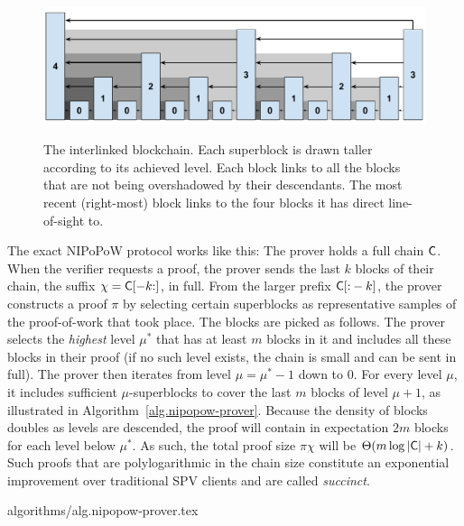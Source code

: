 \begin{figure}[ht]
    \caption{The interlinked blockchain. Each superblock is drawn taller
    according to its achieved level. Each block links to all the blocks that are
    not being overshadowed by their descendants. The most recent (right-most)
    block links to the four blocks it has direct line-of-sight to.}
    \centering
    \includegraphics[width=0.9\columnwidth,keepaspectratio]{figures/level-shadows.pdf}
    \label{fig.hierarchy}
\end{figure}

The exact NIPoPoW protocol works like this: The prover holds a full chain
$\mathsf{C}$. When the verifier requests a proof, the prover sends the last $k$
blocks of their chain, the suffix $\chi = \mathsf{C}[-k{:}]$, in full. From the
larger prefix $\mathsf{C}[{:}-k]$, the prover constructs a proof $\pi$ by selecting
certain superblocks as representative samples of the proof-of-work that took
place. The blocks are picked as follows. The prover selects the \emph{highest}
level $\mu^*$ that has at least $m$ blocks in it and includes all these blocks
in their proof (if no such level exists, the chain is small and can be sent in
full). The prover then iterates from level $\mu = \mu^* - 1$ down to $0$. For
every level $\mu$, it includes sufficient $\mu$-superblocks to cover the last
$m$ blocks of level $\mu + 1$, as illustrated in
Algorithm~\ref{alg.nipopow-prover}. Because the density of blocks doubles as
levels are descended, the proof will contain in expectation $2m$ blocks for each
level below $\mu^*$. As such, the total proof size $\pi \chi$ will be
$\Theta(m\log|\mathsf{C}| + k)$. Such proofs that are polylogarithmic in the chain
size constitute an exponential improvement over traditional SPV clients and are
called \emph{succinct}.

{algorithms/alg.nipopow-prover.tex}

